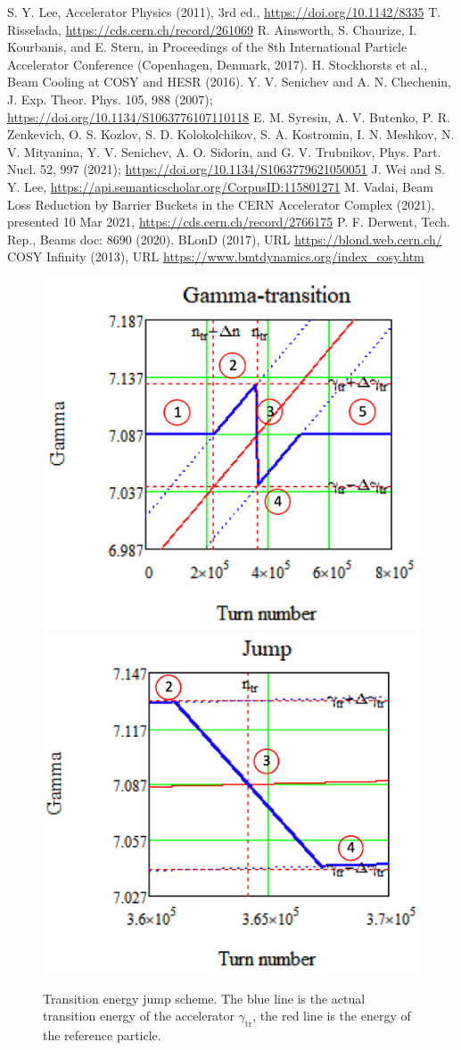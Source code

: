 \documentclass[
aps,%
12pt,%
final,%
notitlepage,%
oneside,%
onecolumn,%
nobibnotes,%
nofootinbib,%
superscriptaddress,%
noshowpacs,%
centertags]%
{revtex4}
\begin{document}
{
	\begin{thebibliography}{11}
	
	S. Y. Lee, Accelerator Physics (2011), 3rd ed., \url{https://doi.org/10.1142/8335}
	T. Risselada, \url{https://cds.cern.ch/record/261069}
	R. Ainsworth, S. Chaurize, I. Kourbanis, and E. Stern, in Proceedings of the 8th International Particle Accelerator Conference (Copenhagen, Denmark, 2017).
	H. Stockhorsts et al., Beam Cooling at COSY and HESR (2016).
	Y. V. Senichev and A. N. Chechenin, J. Exp. Theor. Phys. 105, 988 (2007); \url{https://doi.org/10.1134/S1063776107110118}
	E. M. Syresin, A. V. Butenko, P. R. Zenkevich, O. S. Kozlov, S. D. Kolokolchikov, S. A. Kostromin, I. N. Meshkov, N. V. Mityanina, Y. V. Senichev, A. O. Sidorin, and G. V. Trubnikov, Phys. Part. Nucl. 52, 997 (2021); \url{https://doi.org/10.1134/S1063779621050051}
	J. Wei and S. Y. Lee, \url{https://api.semanticscholar.org/CorpusID:115801271}
	M. Vadai, Beam Loss Reduction by Barrier Buckets in the CERN Accelerator Complex (2021), presented 10 Mar 2021, \url{https://cds.cern.ch/record/2766175}
	P. F. Derwent, Tech. Rep., Beams doc: 8690 (2020).
	BLonD (2017), URL \url{https://blond.web.cern.ch/}
	COSY Infinity (2013), URL \url{https://www.bmtdynamics.org/index_cosy.htm}

\end{thebibliography}

\begin{figure}[!h]
\setcaptionmargin{5mm}
   \includegraphics*[width=.49\columnwidth]{img/fig_01-1}
   \includegraphics*[width=.49\columnwidth]{img/fig_01-2}
\caption{Transition energy jump scheme. The blue line is the actual transition energy of the accelerator $\gamma_{\text{tr}}$, the red line is the energy of the reference particle.}
\label{fig:jump}
\end{figure}

}
\end{document}
